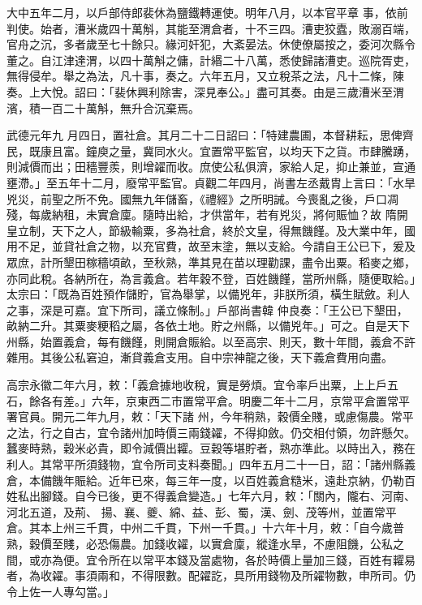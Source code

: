 \begin{pinyinscope}
 大中五年二月，以戶部侍郎裴休為鹽鐵轉運使。明年八月，以本官平章
 事，依前判使。始者，漕米歲四十萬斛，其能至渭倉者，十不三四。漕吏狡蠹，敗溺百端，官舟之沉，多者歲至七十餘只。緣河奸犯，大紊晏法。休使僚屬按之，委河次縣令董之。自江津達渭，以四十萬斛之傭，計緡二十八萬，悉使歸諸漕吏。巡院胥吏，無得侵牟。舉之為法，凡十事，奏之。六年五月，又立稅茶之法，凡十二條，陳奏。上大悅。詔曰：「裴休興利除害，深見奉公。」盡可其奏。由是三歲漕米至渭濱，積一百二十萬斛，無升合沉棄焉。



 武德元年九
 月四日，置社倉。其月二十二日詔曰：「特建農圃，本督耕耘，思俾齊民，既康且富。鐘庾之量，冀同水火。宜置常平監官，以均天下之貨。市肆騰踴，則減價而出；田穡豐羨，則增糴而收。庶使公私俱濟，家給人足，抑止兼並，宣通壅滯。」至五年十二月，廢常平監官。貞觀二年四月，尚書左丞戴胄上言曰：「水旱兇災，前聖之所不免。國無九年儲畜，《禮經》之所明誡。今喪亂之後，戶口凋殘，每歲納租，未實倉廩。隨時出給，才供當年，若有兇災，將何賑恤？故
 隋開皇立制，天下之人，節級輸粟，多為社倉，終於文皇，得無饑饉。及大業中年，國用不足，並貸社倉之物，以充官費，故至末塗，無以支給。今請自王公已下，爰及眾庶，計所墾田稼穡頃畝，至秋熟，準其見在苗以理勸課，盡令出粟。稻麥之鄉，亦同此稅。各納所在，為言義倉。若年穀不登，百姓饑饉，當所州縣，隨便取給。」太宗曰：「既為百姓預作儲貯，官為舉掌，以備兇年，非朕所須，橫生賦斂。利人之事，深是可嘉。宜下所司，議立條制。」戶部尚書韓
 仲良奏：「王公已下墾田，畝納二升。其粟麥粳稻之屬，各依土地。貯之州縣，以備兇年。」可之。自是天下州縣，始置義倉，每有饑饉，則開倉賑給。以至高宗、則天，數十年間，義倉不許雜用。其後公私窘迫，漸貸義倉支用。自中宗神龍之後，天下義倉費用向盡。



 高宗永徽二年六月，敕：「義倉據地收稅，實是勞煩。宜令率戶出粟，上上戶五石，餘各有差。」六年，京東西二市置常平倉。明慶二年十二月，京常平倉置常平署官員。開元二年九月，敕：「天下諸
 州，今年稍熟，穀價全賤，或慮傷農。常平之法，行之自古，宜令諸州加時價三兩錢糴，不得抑斂。仍交相付領，勿許懸欠。蠶麥時熟，穀米必貴，即令減價出糶。豆穀等堪貯者，熟亦準此。以時出入，務在利人。其常平所須錢物，宜令所司支料奏聞。」四年五月二十一日，詔：「諸州縣義倉，本備饑年賑給。近年已來，每三年一度，以百姓義倉糙米，遠赴京納，仍勒百姓私出腳錢。自今已後，更不得義倉變造。」七年六月，敕：「關內，隴右、河南、河北五道，及荊、
 揚、襄、夔、綿、益、彭、蜀，漢、劍、茂等州，並置常平倉。其本上州三千貫，中州二千貫，下州一千貫。」十六年十月，敕：「自今歲普熟，穀價至賤，必恐傷農。加錢收糴，以實倉廩，縱逢水旱，不慮阻饑，公私之間，或亦為便。宜令所在以常平本錢及當處物，各於時價上量加三錢，百姓有糶易者，為收糴。事須兩和，不得限數。配糴訖，具所用錢物及所糴物數，申所司。仍令上佐一人專勾當。」




\end{pinyinscope}
